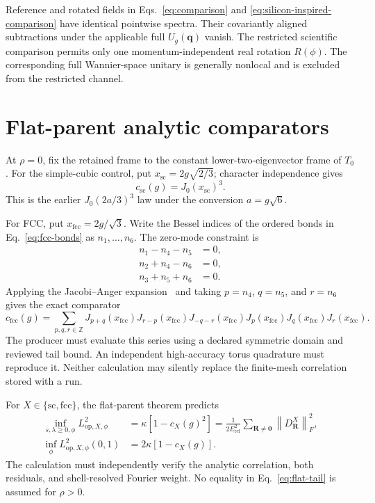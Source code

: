 \documentclass[11pt]{article}
\newcommand{\norm}[1]{\left\lVert #1\right\rVert}
\newcommand{\Z}{\mathbb Z}
\begin{document}
Reference and rotated fields in Eqs.~\eqref{eq:comparison} and
\eqref{eq:silicon-inspired-comparison} have identical pointwise spectra.  Their
covariantly aligned subtractions under the applicable full $U_g(\mathbf q)$ vanish.  The restricted
scientific comparison permits only one momentum-independent real rotation $R(\phi)$.
The corresponding full Wannier-space unitary is generally nonlocal and is excluded from
the restricted channel.

\section{Flat-parent analytic comparators}

At $\rho=0$, fix the retained frame to the constant lower-two-eigenvector frame of
$T_0$.  For the simple-cubic control, put $x_{\mathrm{sc}}=2g\sqrt{2/3}$; character
independence gives
\begin{equation}
 c_{\mathrm{sc}}(g)=J_0(x_{\mathrm{sc}})^3.
 \label{eq:sc-comparator}
\end{equation}
This is the earlier $J_0(2a/3)^3$ law under the conversion
$a=g\sqrt6$.

For FCC, put $x_{\mathrm{fcc}}=2g/\sqrt3$.  Write the Bessel indices of the ordered
bonds in Eq.~\eqref{eq:fcc-bonds} as $n_1,\ldots,n_6$.  The zero-mode constraint is
\begin{align}
 n_1-n_4-n_5&=0,\\
 n_2+n_4-n_6&=0,\\
 n_3+n_5+n_6&=0.
\end{align}
Applying the Jacobi--Anger expansion~\cite{dlmf1012} and taking $p=n_4$, $q=n_5$,
and $r=n_6$ gives the exact comparator
\begin{equation}
 c_{\mathrm{fcc}}(g)
 =\sum_{p,q,r\in\Z}
 J_{p+q}(x_{\mathrm{fcc}})
 J_{r-p}(x_{\mathrm{fcc}})
 J_{-q-r}(x_{\mathrm{fcc}})
 J_p(x_{\mathrm{fcc}})J_q(x_{\mathrm{fcc}})J_r(x_{\mathrm{fcc}}).
 \label{eq:fcc-comparator}
\end{equation}
The producer must evaluate this series using a declared symmetric domain and reviewed
tail bound.  An independent high-accuracy torus quadrature must reproduce it.  Neither
calculation may silently replace the finite-mesh correlation stored with a run.

For $X\in\{\mathrm{sc},\mathrm{fcc}\}$, the flat-parent theorem predicts
\begin{align}
 \inf_{s,\lambda\ge0,\phi}L_{\mathrm{op},X,\phi}^2
 &=\kappa[1-c_X(g)^2]
 =\frac{1}{2E_{\mathrm{ref}}^2}\sum_{\mathbf R\ne\mathbf0}
   \norm{D_{\mathbf R}^{X}}_F^2,
 \label{eq:flat-tail}\\
 \inf_\phi L_{\mathrm{op},X,\phi}^2(0,1)
 &=2\kappa[1-c_X(g)].
\end{align}
The calculation must independently verify the analytic correlation, both residuals,
and shell-resolved Fourier weight.  No equality in Eq.~\eqref{eq:flat-tail} is assumed
for $\rho>0$.
\end{document}
